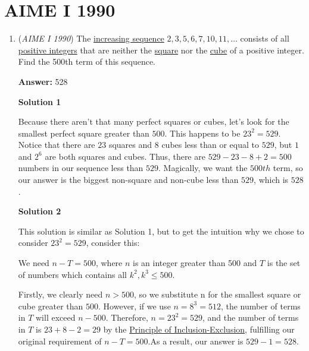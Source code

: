 \section{AIME I 1990}
        \begin{enumerate}
        	\item (\textit{AIME I 1990}) The \href{https://artofproblemsolving.com/wiki/index.php?title=Increasing\_sequence}{increasing sequence} $2,3,5,6,7,10,11,\ldots$ consists of all \href{https://artofproblemsolving.com/wiki/index.php?title=Positive\_integer}{positive integers} that are neither the \href{https://artofproblemsolving.com/wiki/index.php?title=Perfect\_square}{ square} nor the \href{https://artofproblemsolving.com/wiki/index.php?title=Perfect\_cube}{ cube} of a positive integer. Find the 500th term of this sequence.


 
 \textbf{Answer: }528



\textbf{Solution 1}

Because there aren't that many perfect squares or cubes, let's look for the smallest perfect square greater than $500$. This happens to be $23^2=529$. Notice that there are $23$ squares and $8$ cubes less than or equal to $529$, but $1$ and $2^6$ are both squares and cubes. Thus, there are $529-23-8+2=500$ numbers in our sequence less than $529$.  Magically, we want the $500th$ term, so our answer is the biggest non-square and non-cube less than $529$, which is $\boxed{528}$.

 



\textbf{Solution 2}

This solution is similar as Solution 1, but to get the intuition why we chose to consider $23^2 = 529$, consider this:

 We need $n - T = 500$, where $n$ is an integer greater than 500 and $T$ is the set of numbers which contains all $k^2,k^3\le 500$.

 Firstly, we clearly need $n > 500$, so we substitute n for the smallest square or cube greater than $500$. However, if we use $n=8^3=512$, the number of terms in $T$ will exceed $n-500$. Therefore, $n=23^2=529$, and the number of terms in $T$ is $23+8-2=29$ by the \href{https://artofproblemsolving.com/wiki/index.php?title=Principle\_of\_Inclusion-Exclusion}{Principle of Inclusion-Exclusion}, fulfilling our original requirement of $n-T=500$.As a result, our answer is $529-1 = \boxed{528}$.


\end{enumerate}
